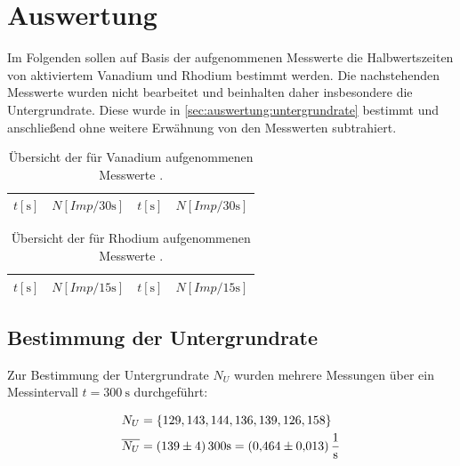 \section{Auswertung} \label{sec:auswertung}

Im Folgenden sollen auf Basis der aufgenommenen Messwerte
die Halbwertszeiten von aktiviertem Vanadium und Rhodium bestimmt werden.
Die nachstehenden Messwerte wurden nicht bearbeitet
und beinhalten daher insbesondere die Untergrundrate.
Diese wurde in \autoref{sec:auswertung:untergrundrate} bestimmt
und anschließend ohne weitere Erwähnung von den Messwerten subtrahiert.

\begin{table}[H]
  \centering
  \caption{Übersicht der für Vanadium aufgenommenen Messwerte \cite{datenundhinweise}.}
  \label{tab:messwerte_vanadium}
  \begin{tabular}{c c | c c}
  \toprule
  $t [\si{\second}]$ &
  $N [\si{{Imp} \per 30 \second}]$ &
  $t [\si{\second}]$ &
  $N [\si{{Imp} \per 30 \second}]$ \\
  \midrule
  
  \bottomrule
  \end{tabular}
\end{table}

\begin{table}[H]
  \centering
  \caption{Übersicht der für Rhodium aufgenommenen Messwerte \cite{datenundhinweise}.}
  \label{tab:messwerte_rhodium}
  \begin{tabular}{c c | c c}
  \toprule
  $t [\si{\second}]$ &
  $N [\si{{Imp} \per 15 \second}]$ &
  $t [\si{\second}]$ &
  $N [\si{{Imp} \per 15 \second}]$ \\
  \midrule
  
  \bottomrule
  \end{tabular}
\end{table}

\subsection{Bestimmung der Untergrundrate}
\label{sec:auswertung:untergrundrate}
Zur Bestimmung der Untergrundrate $N_U$ wurden mehrere Messungen
über ein Messintervall $t = \SI{300}{\second}$ durchgeführt:

\begin{align*}
  N_U &= \{129, 143, 144, 136, 139, 126, 158\} \\
  \overline{N_U} &= \SI{139 \pm 4}{\per{300}\second} = \SI{0.464 \pm 0.013}{\per\second} \\
\end{align*}


